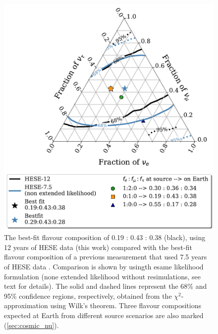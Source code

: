 \begin{figure}[h!]
    \caption{The best-fit flavour composition of 0.19 : 0.43 : 0.38 (black), using 12 years of HESE data (this work) compared with the best-fit flavour composition of a previous measurement that used 7.5 years of HESE data \cite{Juliana_paper}. Comparison is shown by usingth esame likelihood formulation (none extended likelihood without resimulations, see text for details). The solid and dashed lines represent the 68\% and 95\% confidence regions, respectively, obtained from the $\chi^2$-approximation using Wilk's theorem. Three flavour compositions expected at Earth from different source scenarios are also marked (\ref{sec:cosmic_nu}).}
    \includegraphics{./figures/results/HESE7and12_nonextendedonly.pdf}


    
\end{figure}


